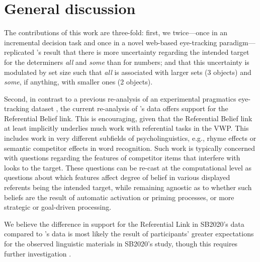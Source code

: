 \documentclass[10pt,letterpaper]{article}
\begin{document}
\section{General discussion}

The contributions of this work are three-fold: first, we twice---once in an incremental decision task and once in a novel web-based eye-tracking paradigm---replicated  's result that there is more uncertainty regarding the intended target for the determiners \emph{all} and \emph{some} than for numbers; and that this uncertainty is modulated by set size such that \emph{all} is associated with larger sets (3 objects) and \emph{some}, if anything, with smaller ones (2 objects). 

Second,  in  contrast to a previous re-analysis \cite{QingLD2018} of an experimental pragmatics eye-tracking dataset \cite{LeffelXiangKennedy2016:Imprecision-is-Pragmatic-}, the current re-analysis of 's data offers  support for the Referential Belief link. This is encouraging, given that the Referential Belief link at least implicitly underlies much work with referential tasks in the VWP. This  includes work in very different subfields of psycholinguistics, e.g., rhyme effects \cite{Allopenna1998} or semantic competitor effects \cite{Dahan2005, Yee2006} in word recognition. Such work is typically concerned with questions regarding the features of competitor items that interfere with looks to the target. These questions can be re-cast at the computational level as questions about which features affect degree of belief in various displayed referents being the intended target, while remaining agnostic as to whether such beliefs are the result of automatic activation or priming processes, or more strategic or goal-driven processing.

We believe the difference in support for the Referential Link in SB2020's data compared to 's data is most likely the result of participants' greater expectations for the observed linguistic materials in SB2020's study, though this requires further investigation \cite<see also>[for debate regarding the importance of implicit object naming in the VWP]{Huettig2007, Pontillo2017}. %
\end{document}
